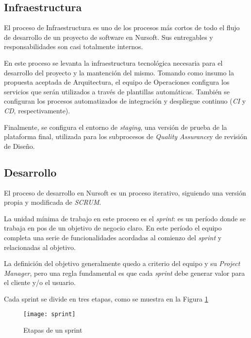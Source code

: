 \subsection{Infraestructura}

El proceso de Infraestructura es uno de los procesos más cortos de todo el flujo de desarrollo de un proyecto de software en Nursoft.
Sus entregables y responsabilidades son casi totalmente internos.

En este proceso se levanta la infraestructura tecnológica necesaria para el desarrollo del proyecto y la mantención del mismo.
Tomando como insumo la propuesta aceptada de Arquitectura, el equipo de Operaciones configura los servicios que serán utilizados
a través de plantillas automáticas. También se configuran los procesos automatizados de integración y despliegue continuo (\textit{CI} y \textit{CD}, respectivamente).

Finalmente, se configura el entorno de \textit{staging}, una versión de prueba de la plataforma final, utilizada para los subprocesos de \textit{Quality Assurance}\footnotemark[11]
y de revisión de Diseño.


\subsection{Desarrollo}

El proceso de desarrollo en Nursoft es un proceso iterativo, siguiendo una versión propia y modificada de \textit{SCRUM}.

La unidad mínima de trabajo en este proceso es el \textit{sprint}: es un período donde se trabaja en pos
de un objetivo de negocio claro. En este período el equipo completa una serie de funcionalidades acordadas al comienzo
del \textit{sprint} y relacionadas al objetivo.

La definición del objetivo generalmente quedo a criterio del equipo y su \textit{Project Manager}, pero una regla
fundamental es que cada \textit{sprint} debe generar valor para el cliente y/o el usuario.

Cada sprint se divide en tres etapas, como se muestra en la Figura \ref{fig:sprint}

\begin{figure}[h]
  \centering
  \texttt{[image: sprint]}
  \caption{Etapas de un sprint}
  \label{fig:sprint}
\end{figure}


